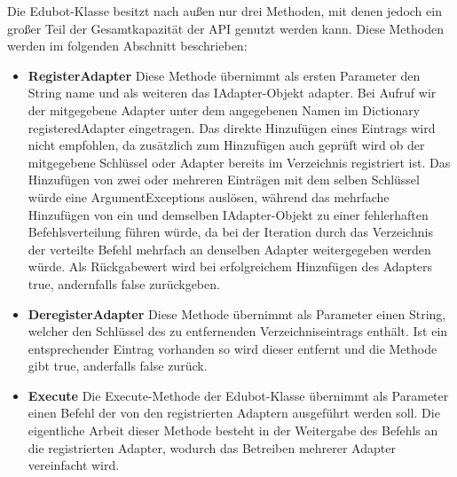 Die Edubot-Klasse besitzt nach außen nur drei Methoden, mit denen jedoch ein großer Teil der Gesamtkapazität der API genutzt werden kann. Diese Methoden werden im folgenden Abschnitt beschrieben:
\begin{itemize}
\item \textbf{RegisterAdapter}
\newline
Diese Methode übernimmt als ersten Parameter den String name und als weiteren das IAdapter-Objekt adapter. Bei Aufruf wir der mitgegebene Adapter unter dem angegebenen Namen im Dictionary registeredAdapter eingetragen. Das direkte Hinzufügen eines Eintrags wird nicht empfohlen, da zusätzlich zum Hinzufügen auch geprüft wird ob der mitgegebene Schlüssel oder Adapter bereits im Verzeichnis registriert ist.
Das Hinzufügen von zwei oder mehreren Einträgen mit dem selben Schlüssel würde eine ArgumentExceptions auslösen, während das mehrfache Hinzufügen von ein und demselben IAdapter-Objekt zu einer fehlerhaften Befehlsverteilung führen würde, da bei der Iteration durch das Verzeichnis der verteilte Befehl mehrfach an denselben Adapter weitergegeben werden würde. 
Als Rückgabewert wird bei erfolgreichem Hinzufügen des Adapters true, andernfalls false zurückgeben.
\item \textbf{DeregisterAdapter}
\newline
Diese Methode übernimmt als Parameter einen String, welcher den Schlüssel des zu entfernenden Verzeichniseintrags enthält. Ist ein entsprechender Eintrag vorhanden so wird dieser entfernt und die Methode gibt true, anderfalls false zurück.
\item \textbf{Execute}
\newline
Die Execute-Methode der Edubot-Klasse übernimmt als Parameter einen Befehl der von den registrierten Adaptern ausgeführt werden soll. Die eigentliche Arbeit dieser Methode besteht in der Weitergabe des Befehls an die registrierten Adapter, wodurch das Betreiben mehrerer Adapter vereinfacht wird. 
\end{itemize}

